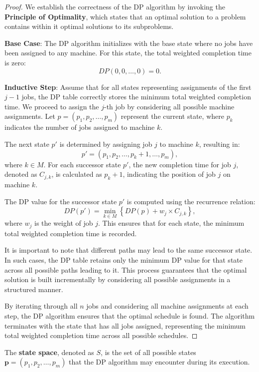 \begin{proof}
    We establish the correctness of the DP algorithm by invoking the \textbf{Principle of Optimality}, which states that an optimal solution to a problem contains within it optimal solutions to its subproblems.

    \textbf{Base Case}: The DP algorithm initializes with the base state where no jobs have been assigned to any machine. For this state, the total weighted completion time is zero:
    \[
        DP(0, 0, \dots, 0) = 0.
    \]
    
    \textbf{Inductive Step}: Assume that for all states representing assignments of the first $j-1$ jobs, the DP table correctly stores the minimum total weighted completion time. We proceed to assign the $j$-th job by considering all possible machine assignments. Let $p = (p_1, p_2, \dots, p_m)$ represent the current state, where $p_k$ indicates the number of jobs assigned to machine $k$.

    The next state $p'$ is determined by assigning job $j$ to machine $k$, resulting in:
    \[
        p' = (p_1, p_2, \dots, p_k + 1, \dots, p_m),
    \]
    where $k \in M$. For each successor state $p'$, the new completion time for job $j$, denoted as $C_{j,k}$, is calculated as $p_k + 1$, indicating the position of job $j$ on machine $k$.

    The DP value for the successor state $p'$ is computed using the recurrence relation:
    \[
        DP(p') = \min_{k \in M} \left\{ DP(p) + w_j \times C_{j,k} \right\},
    \]
    where $w_j$ is the weight of job $j$. This ensures that for each state, the minimum total weighted completion time is recorded.

    It is important to note that different paths may lead to the same successor state. In such cases, the DP table retains only the minimum DP value for that state across all possible paths leading to it. This process guarantees that the optimal solution is built incrementally by considering all possible assignments in a structured manner.

    By iterating through all $n$ jobs and considering all machine assignments at each step, the DP algorithm ensures that the optimal schedule is found. The algorithm terminates with the state that has all jobs assigned, representing the minimum total weighted completion time across all possible schedules.
\end{proof}

\begin{definition} \label{def:state-space}
    The \textbf{state space}, denoted as $S$, is the set of all possible states $\boldsymbol{p} = (p_1, p_2, \dots, p_m)$ that the DP algorithm may encounter during its execution.
\end{definition}

